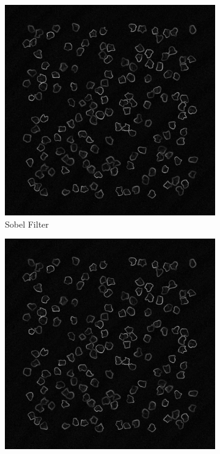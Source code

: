 \documentclass[%
	a4paper, %
	12pt, %
	english, %
	bibtotoc %
]{scrartcl}
\begin{document}
\begin{figure}[H]
    \centering
    \begin{subfigure}[b]{0.4\textwidth}
        \centering
        \includegraphics[width=\textwidth]{sobel_filter.png}
        \caption{Sobel Filter}
        \label{fig:sobel_img}
    \end{subfigure}
    \hspace{1cm} %
    \begin{subfigure}[b]{0.4\textwidth}
        \centering
        \includegraphics[width=\textwidth]{scharr_filter.png}

\end{subfigure}
\end{figure}
\end{document}
